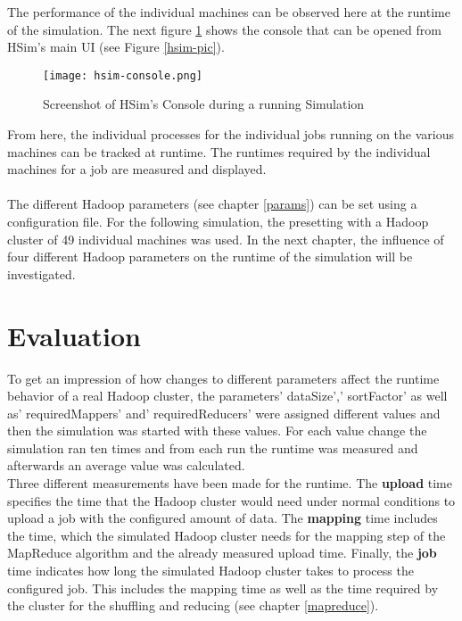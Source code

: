 The performance of the individual machines can be observed here at the runtime of the simulation. The next figure \ref{hsim-console} shows the console that can be opened from HSim's main UI (see Figure \ref{hsim-pic}).
\begin{figure}[H]
	\centering
	\texttt{[image: hsim-console.png]}
	\caption[Caption for LOF]{Screenshot of HSim's Console during a running Simulation}
	\label{hsim-console}
\end{figure}
From here, the individual processes for the individual jobs running on the various machines can be tracked at runtime. The runtimes required by the individual machines for a job are measured and displayed.
\\\\
The different Hadoop parameters (see chapter \ref{params}) can be set using a configuration file. For the following simulation, the presetting with a Hadoop cluster of 49 individual machines was used. In the next chapter, the influence of four different Hadoop parameters on the runtime of the simulation will be investigated.
\chapter{Evaluation}
\label{eval}
To get an impression of how changes to different parameters affect the runtime behavior of a real Hadoop cluster, the parameters' dataSize',' sortFactor' as well as' requiredMappers' and' requiredReducers' were assigned different values and then the simulation was started with these values. For each value change the simulation ran ten times and from each run the runtime was measured and afterwards an average value was calculated.
\\
Three different measurements have been made for the runtime. The \textbf{upload} time specifies the time that the Hadoop cluster would need under normal conditions to upload a job with the configured amount of data. The \textbf{mapping} time includes the time, which the simulated Hadoop cluster needs for the mapping step of the MapReduce algorithm and the already measured upload time. Finally, the \textbf{job} time indicates how long the simulated Hadoop cluster takes to process the configured job. This includes the mapping time as well as the time required by the cluster for the shuffling and reducing (see chapter \ref{mapreduce}).

